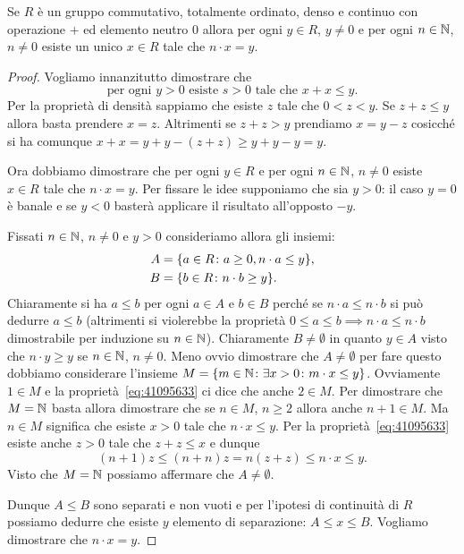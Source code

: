 \begin{theorem}[divisibilità]
Se $R$ è un gruppo commutativo, totalmente ordinato, denso e continuo
con operazione $+$ ed elemento neutro $0$
allora per ogni $y\in R$, $y\neq 0$ e per ogni $n\in {\mathbb N}$, $n\neq 0$ 
esiste un unico $x\in R$ tale che $n\cdot x = y$.
\end{theorem}
\begin{proof}
Vogliamo innanzitutto dimostrare che 
\begin{equation}\label{eq:41095633}
  \text{per ogni $y>0$ esiste 
  $s>0$ tale che $x+x\le y$}. 
\end{equation}
Per la proprietà di densità sappiamo che esiste $z$ tale che 
$0<z<y$. 
Se $z+z\le y$ allora basta prendere $x=z$.
Altrimenti se $z+z>y$ prendiamo $x=y-z$ cosicché si ha comunque
$x+x = y+y-(z+z) \ge y+y-y = y$.

Ora dobbiamo dimostrare che per ogni $y\in R$ e per ogni $n\in {\mathbb N}$, $n\neq 0$
esiste $x\in R$ tale che $n\cdot x=y$.
Per fissare le idee supponiamo che sia $y>0$: il caso $y=0$ è banale 
e se $y<0$ basterà applicare il risultato all'opposto $-y$.

Fissati $n\in {\mathbb N}$, $n\neq 0$ e $y>0$ 
consideriamo allora gli insiemi:
\begin{align*}
  A &= {\left\{ a\in R\colon a\ge 0, n\cdot a\le y \right\}},\\
  B &= {\left\{ b\in R\colon n\cdot b\ge y \right\}}.
\end{align*}
Chiaramente si ha $a\le b$ per ogni $a\in A$ e $b\in B$ 
perché se $n\cdot a \le n\cdot b$ 
si può dedurre $a\le b$ (altrimenti si violerebbe
la proprietà $0\le a\le b \implies n\cdot a\le n\cdot b$ dimostrabile 
per induzione su $n\in {\mathbb N}$).
Chiaramente $B\neq \emptyset$ in quanto $y\in A$ visto che $n\cdot y\ge y$ se 
$n\in {\mathbb N}$, $n\neq 0$.
Meno ovvio dimostrare che $A\neq \emptyset$ per fare questo
dobbiamo considerare l'insieme 
$M={\left\{ m\in{\mathbb N}\colon \exists x>0\colon m\cdot x\le y \right\}}$.
Ovviamente $1\in M$ e la proprietà~\eqref{eq:41095633}
ci dice che anche $2\in M$. 
Per dimostrare che $M={\mathbb N}$ basta allora dimostrare che 
se $n\in M$, $n\ge 2$ allora anche $n+1\in M$. 
Ma $n\in M$ significa che esiste $x>0$ tale che 
$n\cdot x\le y$. 
Per la proprietà~\eqref{eq:41095633} esiste anche $z>0$ 
tale che $z+z\le x$ e dunque 
\[
  (n+1)z \le (n+n)z = n(z+z)\le n\cdot x \le y.
\]
Visto che $M = {\mathbb N}$ possiamo affermare che $A\neq \emptyset$.

Dunque $A\le B$ sono separati e non vuoti e per l'ipotesi di continuità di $R$ 
possiamo dedurre che esiste $y$ elemento di separazione: $A\le x \le B$.
Vogliamo dimostrare che $n\cdot x=y$.


\end{proof}
